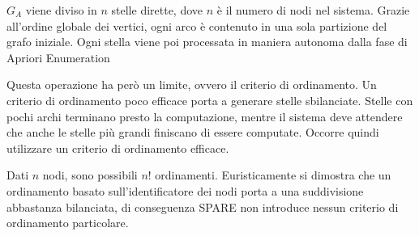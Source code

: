\(G_A\) viene diviso in \(n\) stelle dirette, dove \(n\) è il numero di nodi nel sistema.
Grazie all'ordine globale dei vertici, ogni arco è contenuto in una sola partizione del grafo iniziale.
Ogni stella viene poi processata in maniera autonoma dalla fase di Apriori Enumeration

Questa operazione ha però un limite, ovvero il criterio di ordinamento.
Un criterio di ordinamento poco efficace porta a generare stelle sbilanciate.
Stelle con pochi archi terminano presto la computazione, mentre il sistema deve attendere che anche le stelle più grandi finiscano di essere computate.
Occorre quindi utilizzare un criterio di ordinamento efficace.

Dati \(n\) nodi, sono possibili \(n!\) ordinamenti.
Euristicamente si dimostra che un ordinamento basato sull'identificatore dei nodi porta a una suddivisione abbastanza bilanciata, di conseguenza SPARE non introduce nessun criterio di ordinamento particolare.